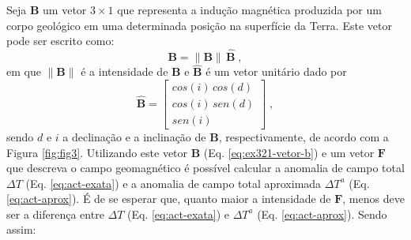\documentclass[10pt,a4paper,fleqn]{article}
\begin{document}
Seja $\mathbf{B}$ um vetor $3 \times 1$ que representa a induç\~{a}o magn\'{e}tica produzida
por um corpo geol\'{o}gico em uma determinada posiç\~{a}o na superf\'{i}cie da Terra. Este
vetor pode ser escrito como:
\begin{equation}
\mathbf{B} = \| \mathbf{B} \| \, \hat{\mathbf{B}} \; ,
\label{eq:ex321-vetor-b}
\end{equation}
em que $\| \mathbf{B} \|$ \'{e} a intensidade de $\mathbf{B}$ e $\hat{\mathbf{B}}$ é um vetor unitário
dado por
\begin{equation}
\hat{\mathbf{B}} = \left[
\begin{array}{c}
cos(i) \, cos(d) \\
cos(i) \, sen(d) \\
sen(i)
\end{array}
\right] \; ,
\label{eq:ex321-versor-b}
\end{equation}
sendo $d$ e $i$ a declinação e a inclinação de $\mathbf{B}$, respectivamente, de 
acordo com a Figura \ref{fig:fig3}. Utilizando este vetor $\mathbf{B}$ (Eq. 
\ref{eq:ex321-vetor-b}) e um vetor $\mathbf{F}$ que descreva o campo geomagn\'{e}tico
\'{e} poss\'{i}vel calcular a anomalia de campo total $\Delta T$ (Eq. 
\ref{eq:act-exata}) e a anomalia de campo total aproximada $\Delta T^{a}$ (Eq. 
\ref{eq:act-aprox}). \'{E} de se esperar que, quanto maior a intensidade de $\mathbf{F}$,
menos deve ser a diferença entre  $\Delta T$ (Eq. \ref{eq:act-exata}) e $\Delta T^{a}$ 
(Eq. \ref{eq:act-aprox}). Sendo assim:
\end{document}
